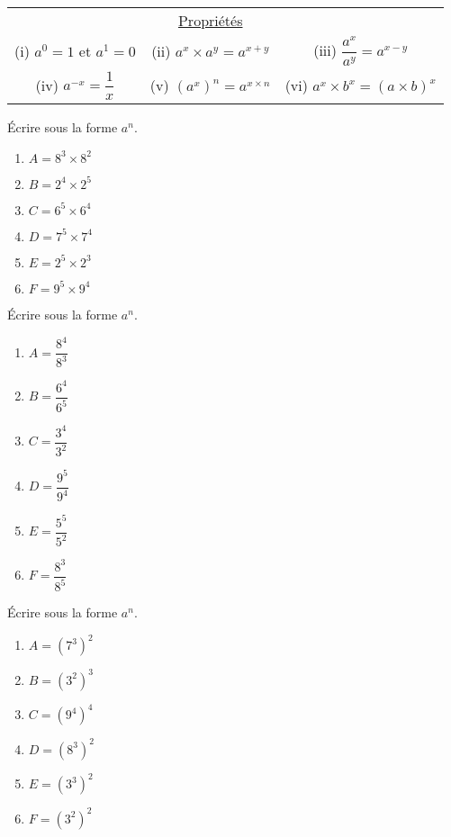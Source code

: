 \documentclass[11pt]{article}
\begin{document}
\begin{center}
\renewcommand{\arraystretch}{2.5} %
\begin{tabular}{|ccc|}
\hline
&\underline{Propriétés}& \\
(i) $a^0=1$ et $a^1=0$ & (ii) $a^x \times a^y = a^{x+y}$ &
(iii) $\dfrac{a^x}{a^y}=a^{x-y}$ \\ 
(iv) $a^{-x}=\dfrac{1}{x}$ & (v) $(a^x)^n=a^{x \times n}$ & (vi) $a^x
\times b^x = (a \times b)^x$ \\ \hline
\end{tabular}
\renewcommand{\arraystretch}{1.5} 
\end{center}

\begin{multicols}{2}
\begin{exercice}[1]
Écrire sous la forme $a^n$.
\begin{multicols}{2}
\begin{enumerate}[label=\arabic*)]
\item $A=8^{3}\times 8^{2}$
\item $B=2^{4}\times 2^{5}$
\item $C=6^{5}\times 6^{4}$
\item $D=7^{5}\times 7^{4}$
\item $E=2^{5}\times 2^{3}$
\item $F=9^{5}\times 9^{4}$
\end{enumerate}
\end{multicols}
\end{exercice}

\begin{exercice}[1]
Écrire sous la forme $a^n$.
\begin{multicols}{2}
\begin{enumerate}[label=\arabic*)]
\item $A=\dfrac{8^{4}}{8^{3}}$
\item $B=\dfrac{6^{4}}{6^{5}}$
\item $C=\dfrac{3^{4}}{3^{2}}$
\item $D=\dfrac{9^{5}}{9^{4}}$
\item $E=\dfrac{5^{5}}{5^{2}}$
\item $F=\dfrac{8^{3}}{8^{5}}$
\end{enumerate}
\end{multicols}
\end{exercice}

\begin{exercice}[1]
Écrire sous la forme $a^n$.
\begin{multicols}{2}
\begin{enumerate}[label=\arabic*)]
\item $A=(7^{3})^{2}$
\item $B=(3^{2})^{3}$
\item $C=(9^{4})^{4}$
\item $D=(8^{3})^{2}$
\item $E=(3^{3})^{2}$
\item $F=(3^{2})^{2}$
\end{enumerate}
\end{multicols}
\end{exercice}


\end{multicols}
\end{document}
